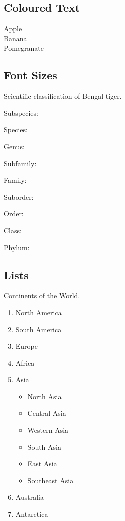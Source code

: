 \documentclass[a4paper,12pt]{article}
\begin{document}
\subsection{Coloured Text}
{\color{red}Apple}\\
{\color{yellow}Banana}\\
{\color{magenta}Pomegranate}\\

\subsection{Font Sizes}
Scientific classification of Bengal tiger.


Subspecies:


Species:


Genus:


Subfamily:


Family:


Suborder:


Order:


Class:


Phylum:

\newpage

\subsection{Lists}

Continents of the World.


\begin{enumerate}
    \item North America 
    \item South America
    \item Europe
    \item Africa 
    \item Asia
    \begin{itemize}
        \item North Asia
        \item Central Asia
        \item Western Asia
        \item South Asia
        \item East Asia
        \item Southeast Asia
    \end{itemize}
    \item Australia 
    \item Antarctica 
\end{enumerate}
\end{document}
